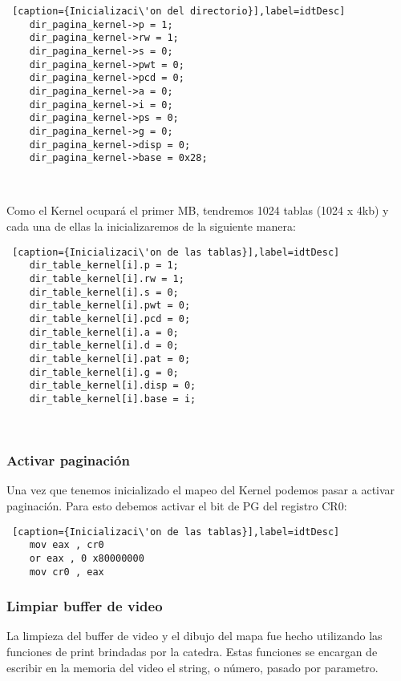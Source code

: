 \begin{lstlisting} [caption={Inicializaci\'on del directorio}],label=idtDesc] 
	dir_pagina_kernel->p = 1;
	dir_pagina_kernel->rw = 1;
	dir_pagina_kernel->s = 0;
	dir_pagina_kernel->pwt = 0;
	dir_pagina_kernel->pcd = 0;
	dir_pagina_kernel->a = 0;
	dir_pagina_kernel->i = 0;
	dir_pagina_kernel->ps = 0;
	dir_pagina_kernel->g = 0;
	dir_pagina_kernel->disp = 0;
	dir_pagina_kernel->base = 0x28;
\end{lstlisting}


\\
\par{Como el Kernel ocupar\'a el primer MB, tendremos 1024 tablas (1024 x 4kb) y cada una de ellas la inicializaremos de la siguiente manera:}
\begin{lstlisting} [caption={Inicializaci\'on de las tablas}],label=idtDesc] 
	dir_table_kernel[i].p = 1;
	dir_table_kernel[i].rw = 1;
	dir_table_kernel[i].s = 0;
	dir_table_kernel[i].pwt = 0;
	dir_table_kernel[i].pcd = 0;
	dir_table_kernel[i].a = 0;
	dir_table_kernel[i].d = 0;
	dir_table_kernel[i].pat = 0;
	dir_table_kernel[i].g = 0;
	dir_table_kernel[i].disp = 0;
	dir_table_kernel[i].base = i;
\end{lstlisting}


\\
\subsubsection*{Activar paginaci\'on}
\par{Una vez que tenemos inicializado el mapeo del Kernel podemos pasar a activar paginaci\'on. Para esto debemos activar el bit de PG del registro CR0:}

\begin{lstlisting} [caption={Inicializaci\'on de las tablas}],label=idtDesc] 
    mov eax , cr0
    or eax , 0 x80000000
    mov cr0 , eax
\end{lstlisting}

\subsubsection*{Limpiar buffer de video}
\par{La limpieza del buffer de video y el dibujo del mapa fue hecho utilizando las funciones de print brindadas por la catedra. Estas funciones se encargan de escribir en la memoria del video el string, o n\'umero,  pasado por parametro.}

